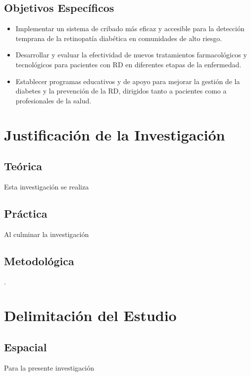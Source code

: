 \subsection{Objetivos Espec\'{i}ficos}
\newcommand{\Objone}{
	Implementar un sistema de cribado más eficaz y accesible para la detección temprana de la retinopatía diabética en comunidades de alto riesgo.
}
\newcommand{\Objtwo}{
	Desarrollar y evaluar la efectividad de nuevos tratamientos farmacológicos y tecnológicos para pacientes con RD en diferentes etapas de la enfermedad.
}
\newcommand{\Objthree}{
	Establecer programas educativos y de apoyo para mejorar la gestión de la diabetes y la prevención de la RD, dirigidos tanto a pacientes como a profesionales de la salud.

}
\newcommand{\Objfour}{
	hhhg
}
\newcommand{\Objfive}{
	ghhhg
}

\begin{itemize}
	\item {\Objone}
	\item {\Objtwo}
	\item {\Objthree}

\end{itemize}

\section{Justificación de la Investigación}

\subsection{Teórica}
Esta investigación se realiza 

\subsection{Práctica}
Al culminar la investigación 

\subsection{Metodológica}. 

\section{Delimitación del Estudio}

\subsection{Espacial}
Para la presente investigación 

